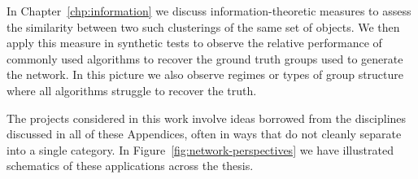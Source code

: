 In Chapter~\ref{chp:information} we discuss information-theoretic measures to assess the similarity between two such clusterings of the same set of objects. We then apply this measure in synthetic tests to observe the relative performance of commonly used algorithms to recover the ground truth groups used to generate the network. In this picture we also observe regimes or types of group structure where all algorithms struggle to recover the truth. 

The projects considered in this work involve ideas borrowed from the disciplines discussed in all of these Appendices, often in ways that do not cleanly separate into a single category. In Figure~\ref{fig:network-perspectives} we have illustrated schematics of these applications across the thesis.